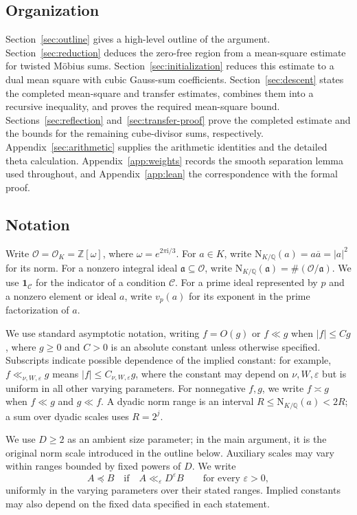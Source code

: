\documentclass[11pt,a4paper]{article}
\numberwithin{equation}{section}
\numberwithin{figure}{section}
\theoremstyle{definition}
\theoremstyle{remark}
\newcommand{\Q}{\mathbb Q}
\newcommand{\NK}{\mathrm N_{K/\Q}}
\newcommand{\OO}{\mathcal O}
\newcommand{\ind}{\mathbf1}
\newcommand{\precbd}{\preccurlyeq}
\begin{document}
\subsection{Organization}

Section~\ref{sec:outline} gives a high-level outline of the argument.
Section~\ref{sec:reduction} deduces the zero-free region from a
mean-square estimate for twisted M\"obius sums.
Section~\ref{sec:initialization} reduces this estimate to a dual mean
square with cubic Gauss-sum coefficients.
Section~\ref{sec:descent} states the completed mean-square and transfer
estimates, combines them into a recursive inequality, and proves the
required mean-square bound.
Sections~\ref{sec:reflection} and~\ref{sec:transfer-proof} prove the
completed estimate and the bounds for the remaining cube-divisor sums, respectively.
Appendix~\ref{sec:arithmetic} supplies the arithmetic identities and
the detailed theta calculation. Appendix~\ref{app:weights} records the smooth
separation lemma used throughout, and Appendix~\ref{app:lean} the correspondence with
the formal proof.

\subsection{Notation}

Write $\OO=\OO_K=\mathbb Z[\omega]$, where $\omega=e^{2\pi\mathrm i/3}$.
For $a\in K$, write $\NK(a)=a\overline a=|a|^2$ for its norm.
For a nonzero integral ideal $\mathfrak a\subseteq\OO$, write
$\NK(\mathfrak a)=\#(\OO/\mathfrak a)$.
We use $\ind_{\mathcal C}$ for the indicator of a condition $\mathcal C$.
For a prime ideal represented by $p$ and a nonzero element or ideal $a$,
write $v_p(a)$ for its exponent in the prime factorization of $a$.


We use standard asymptotic notation, writing $f=O(g)$ or $f\ll g$ when $|f|\le Cg$, where $g\ge0$ and $C>0$ is an absolute constant unless otherwise specified. Subscripts indicate possible dependence of the implied constant: for example, $f\ll_{\nu,W,\varepsilon}g$ means $|f|\le C_{\nu,W,\varepsilon}g$, where the constant may depend on $\nu,W,\varepsilon$ but is uniform in all other varying parameters. For nonnegative $f,g$, we write $f\asymp g$ when $f\ll g$ and $g\ll f$.
 A dyadic norm range is an interval $R\le\NK(a)<2R$; a sum over dyadic scales uses $R=2^j$.

We use $D\ge2$ as an ambient size parameter; in the main argument, it is the original norm scale introduced 
in the outline below. Auxiliary scales may vary within ranges bounded by fixed powers of $D$. We write
\[
A\precbd B \quad\text{if}\quad A\ll_\varepsilon D^\varepsilon B
\qquad\text{for every }\varepsilon>0,
\]
uniformly in the varying parameters over their stated ranges. Implied constants may also depend on the fixed data specified in each statement.
\end{document}
